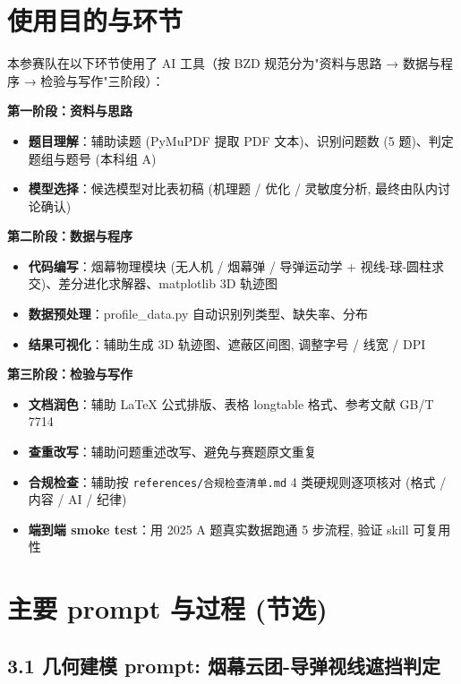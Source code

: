 \documentclass[electronic]{format}
\renewcommand{\textbf}[1]{{\song\bfseries #1}}
\begin{document}
\section{使用目的与环节}

本参赛队在以下环节使用了 AI 工具（按 BZD 规范分为"资料与思路 → 数据与程序 → 检验与写作"三阶段）：

\textbf{第一阶段：资料与思路}
\begin{itemize}[itemindent=2em]
  \item \textbf{题目理解}：辅助读题 (PyMuPDF 提取 PDF 文本)、识别问题数 (5 题)、判定题组与题号 (本科组 A)
  \item \textbf{模型选择}：候选模型对比表初稿 (机理题 / 优化 / 灵敏度分析, 最终由队内讨论确认)
\end{itemize}

\textbf{第二阶段：数据与程序}
\begin{itemize}[itemindent=2em]
  \item \textbf{代码编写}：烟幕物理模块 (无人机 / 烟幕弹 / 导弹运动学 + 视线-球-圆柱求交)、差分进化求解器、matplotlib 3D 轨迹图
  \item \textbf{数据预处理}：profile\_data.py 自动识别列类型、缺失率、分布
  \item \textbf{结果可视化}：辅助生成 3D 轨迹图、遮蔽区间图, 调整字号 / 线宽 / DPI
\end{itemize}

\textbf{第三阶段：检验与写作}
\begin{itemize}[itemindent=2em]
  \item \textbf{文档润色}：辅助 LaTeX 公式排版、表格 longtable 格式、参考文献 GB/T 7714
  \item \textbf{查重改写}：辅助问题重述改写、避免与赛题原文重复
  \item \textbf{合规检查}：辅助按 \texttt{references/合规检查清单.md} 4 类硬规则逐项核对 (格式 / 内容 / AI / 纪律)
  \item \textbf{端到端 smoke test}：用 2025 A 题真实数据跑通 5 步流程, 验证 skill 可复用性
\end{itemize}

\section{主要 prompt 与过程 (节选)}

\subsection{3.1 几何建模 prompt: 烟幕云团-导弹视线遮挡判定}
\end{document}

